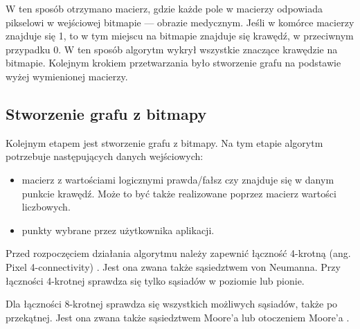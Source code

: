 \documentclass[a4paper,11pt,twoside,openright]{report}
\theoremstyle{definition}
\begin{document}
W ten sposób otrzymano macierz, gdzie każde pole w macierzy odpowiada pikselowi w wejściowej bitmapie --- obrazie medycznym. Jeśli w komórce macierzy znajduje się 1, to w tym miejscu na bitmapie znajduje się krawędź, w przeciwnym przypadku 0. W ten sposób algorytm wykrył wszystkie znaczące krawędzie na bitmapie. Kolejnym krokiem przetwarzania było stworzenie grafu na podstawie wyżej wymienionej macierzy.

\subsection {Stworzenie grafu z bitmapy}

Kolejnym etapem jest stworzenie grafu z bitmapy. Na tym etapie algorytm potrzebuje następujących danych wejściowych:
\begin{itemize}[noitemsep]
\item macierz z wartościami logicznymi prawda/fałsz czy znajduje się w danym punkcie krawędź. Może to być także realizowane poprzez macierz wartości liczbowych.
\item punkty wybrane przez użytkownika aplikacji.
\end{itemize}

Przed rozpoczęciem działania algorytmu należy zapewnić łączność 4-krotną (ang. Pixel 4-connectivity) \cite{Pixel connectivity}. Jest ona zwana także sąsiedztwem von Neumanna. Przy łączności 4-krotnej sprawdza się tylko sąsiadów w poziomie lub pionie.

\begin{center}
\end{center}

Dla łączności 8-krotnej sprawdza się wszystkich możliwych sąsiadów, także po przekątnej. Jest ona zwana także sąsiedztwem Moore'a lub otoczeniem Moore'a \cite{Moore}.

\begin{center}
\end{center}
\end{document}
